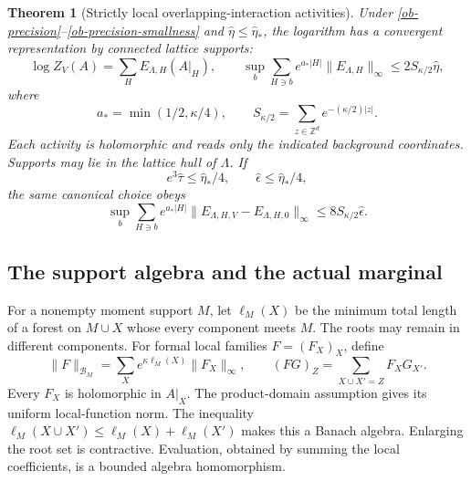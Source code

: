 \documentclass[11pt]{article}
\newtheorem{theorem}{Theorem}[section]
\theoremstyle{remark}
\begin{document}
\begin{theorem}[Strictly local overlapping-interaction activities]
\label{ob-theorem}
Under \eqref{ob-precision}--\eqref{ob-precision-smallness} and
$\widehat\eta\le\widehat\eta_*$, the logarithm has a convergent
representation by connected lattice supports:
\begin{equation}\label{ob-local-log}
 \log Z_V(A)=\sum_H E_{\Lambda,H}(A|_H),\qquad
 \sup_b\sum_{H\ni b}e^{a_*|H|}
        \|E_{\Lambda,H}\|_\infty
 \le2S_{\kappa/2}\widehat\eta,
\end{equation}
where
\[
 a_*=\min(1/2,\kappa/4),\qquad
 S_{\kappa/2}=\sum_{z\in\mathbb Z^d}e^{-(\kappa/2)|z|}.
\]
Each activity is holomorphic and reads only the indicated
background coordinates. Supports may lie in the lattice hull of
$\Lambda$. If
\begin{equation}\label{ob-quarter}
 e^3\widehat\tau\le\widehat\eta_*/4,\qquad
 \widehat\epsilon\le\widehat\eta_*/4,
\end{equation}
the same canonical choice obeys
\begin{equation}\label{ob-difference}
 \sup_b\sum_{H\ni b}e^{a_*|H|}
  \|E_{\Lambda,H,V}-E_{\Lambda,H,0}\|_\infty
 \le8S_{\kappa/2}\widehat\epsilon.
\end{equation}
\end{theorem}

\subsection{The support algebra and the actual marginal}

For a nonempty moment support $M$, let $\ell_M(X)$ be the
minimum total length of a forest on $M\cup X$ whose every
component meets $M$. The roots may remain in different components.
For formal local families $F=(F_X)_X$, define
\begin{equation}\label{ob-algebra}
 \|F\|_{\mathcal B_M}
   =\sum_Xe^{\kappa\ell_M(X)}\|F_X\|_\infty,\qquad
 (FG)_Z=\sum_{X\cup X'=Z}F_XG_{X'}.
\end{equation}
Every $F_X$ is holomorphic in $A|_X$. The product-domain
assumption gives its uniform local-function norm.
The inequality
$\ell_M(X\cup X')\le\ell_M(X)+\ell_M(X')$
makes this a Banach algebra. Enlarging the root set is
contractive. Evaluation, obtained by summing the local
coefficients, is a bounded algebra homomorphism.
\end{document}
